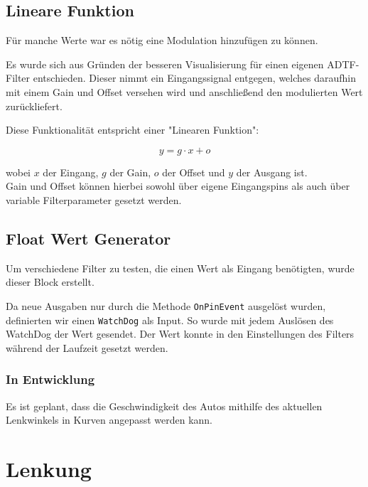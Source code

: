 \documentclass[a4paper,12pt]{report}
\begin{document}
\section{Lineare Funktion}


	Für manche Werte war es nötig eine Modulation hinzufügen zu können.

	Es wurde sich aus Gründen der besseren Visualisierung für einen eigenen ADTF-Filter entschieden.
	Dieser nimmt ein Eingangssignal entgegen, welches daraufhin mit einem Gain und Offset versehen wird und anschließend den modulierten Wert zurückliefert.

	Diese Funktionalität entspricht einer "Linearen Funktion":

	\[y = g \cdot x + o\]

	wobei $x$ der Eingang, $g$ der Gain, $o$ der Offset und $y$ der Ausgang ist.
	\\
	Gain und Offset können hierbei sowohl über eigene Eingangspins als auch über variable Filterparameter gesetzt werden.


\section{Float Wert Generator}

	Um verschiedene Filter zu testen, die einen Wert als Eingang benötigten, wurde dieser Block erstellt.

	Da neue Ausgaben nur durch die Methode \texttt{OnPinEvent} ausgelöst wurden, definierten wir einen \texttt{WatchDog} als Input. So wurde mit jedem Auslösen des WatchDog der Wert gesendet. Der Wert konnte in den Einstellungen des Filters während der Laufzeit gesetzt werden.


\subsection{In Entwicklung}

	Es ist geplant, dass die Geschwindigkeit des Autos mithilfe des aktuellen Lenkwinkels in Kurven angepasst werden kann.

\chapter{Lenkung}
\end{document}
